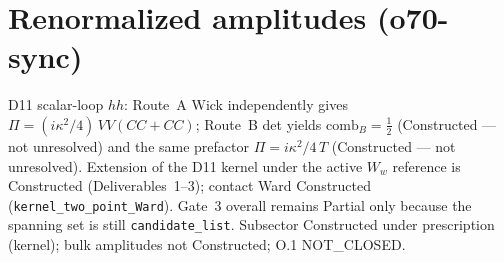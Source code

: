\section{Renormalized amplitudes (o70-sync)}
\label{sec:O-renorm-amp}

D11 scalar-loop $hh$: Route~A Wick independently gives
$\Pi=(i\kappa^2/4)\,VV(CC+CC)$; Route~B det yields $\mathrm{comb}_B=\tfrac12$
(Constructed --- not unresolved) and the same prefactor
$\Pi=i\kappa^2/4\,T$ (Constructed --- not unresolved).
Extension of the D11 kernel under the active $W_w$ reference is Constructed
(Deliverables~1--3); contact Ward Constructed (\texttt{kernel\_two\_point\_Ward}).
Gate~3 overall remains Partial only because the spanning set is still
\texttt{candidate\_list}. Subsector Constructed under prescription (kernel);
bulk amplitudes not Constructed; O.1 NOT\_CLOSED.
